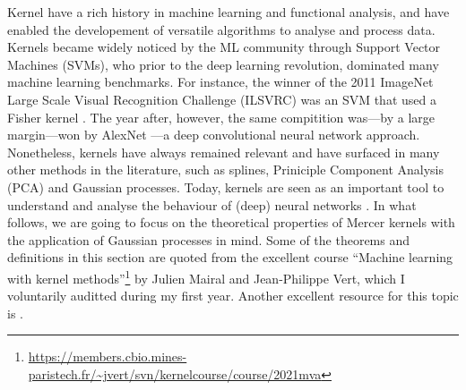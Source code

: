 Kernel have a rich history in machine learning and functional analysis, and have enabled the developement of versatile algorithms to analyse and process data. Kernels became widely noticed by the ML community through Support Vector Machines (SVMs), who prior to the deep learning revolution, dominated many machine learning benchmarks. %
For instance, the winner of the 2011 ImageNet Large Scale Visual Recognition Challenge (ILSVRC) was an SVM that used a Fisher kernel \citep{perronnin2010large}. The year after, however, the same compitition was---by a large margin---won by AlexNet \citep{alexnet}---a deep convolutional neural network approach. Nonetheless, kernels have always remained relevant and have surfaced in many other methods in the literature, such as splines, Priniciple Component Analysis (PCA) and Gaussian processes. Today, kernels are seen as an important tool to understand and analyse the behaviour of (deep) neural networks \citep[e.g.,][]{jacot2018neural}. %
In what follows, we are going to focus on the theoretical properties of Mercer kernels with the application of Gaussian processes in mind. Some of the theorems and definitions in this section are quoted from the excellent course ``Machine learning with kernel methods''\footnote{\url{https://members.cbio.mines-paristech.fr/~jvert/svn/kernelcourse/course/2021mva}} by Julien Mairal and Jean-Philippe Vert, which I voluntarily auditted during my first year. Another excellent resource for this topic is \citet{kanagawa2018gaussian}.


